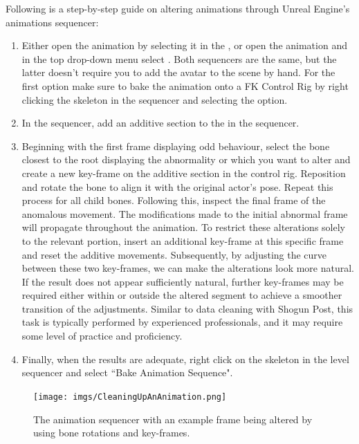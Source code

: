 \documentclass{uva-inf-article}
\begin{document}
Following is a step-by-step guide on altering animations through Unreal Engine's animations sequencer:
\begin{enumerate}
    \item Either open the animation by selecting it in the , or open the animation and in the top  drop-down menu select . Both sequencers are the same, but the latter doesn't require you to add the avatar to the scene by hand. For the first option make sure to bake the animation onto a FK Control Rig by right clicking the skeleton in the sequencer and selecting the  option.
    \item In the sequencer, add an additive section to the  in the sequencer.
    \item Beginning with the first frame displaying odd behaviour, select the bone closest to the root displaying the abnormality or which you want to alter and create a new key-frame on the additive section in the control rig. Reposition and rotate the bone to align it with the original actor's pose. Repeat this process for all child bones. Following this, inspect the final frame of the anomalous movement. The modifications made to the initial abnormal frame will propagate throughout the animation. To restrict these alterations solely to the relevant portion, insert an additional key-frame at this specific frame and reset the additive movements. Subsequently, by adjusting the curve between these two key-frames, we can make the alterations look more natural. If the result does not appear sufficiently natural, further key-frames may be required either within or outside the altered segment to achieve a smoother transition of the adjustments. Similar to data cleaning with Shogun Post, this task is typically performed by experienced professionals, and it may require some level of practice and proficiency.
    \item Finally, when the results are adequate, right click on the skeleton in the level sequencer and select ``Bake Animation Sequence".
\end{enumerate}

\begin{figure}[hbt!]
    \centering
    \texttt{[image: imgs/CleaningUpAnAnimation.png]}
    \caption{The animation sequencer with an example frame being altered by using bone rotations and key-frames.}
    \label{fig:animationsequencer}
\end{figure}
\end{document}

